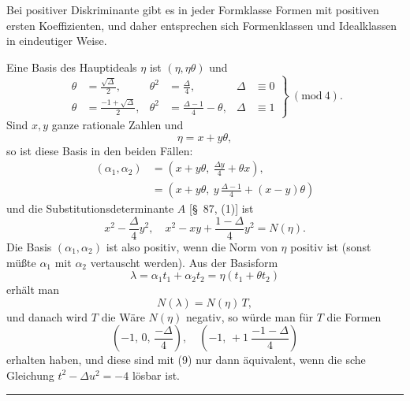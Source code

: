 

Bei positiver Diskriminante gibt es in jeder Formklasse Formen mit positiven ersten Koeffizienten, und daher entsprechen sich Formenklassen und Idealklassen in eindeutiger Weise.

Eine Basis des Hauptideals $\eta$ ist $(\eta, \eta\theta)$ und
\[
\left.\begin{aligned}
\theta &= \frac{\sqrt{\Delta}}{2}, & \theta^2 &= \frac{\Delta}{4}, & \Delta &\equiv 0\\
\theta &= \frac{-1+\sqrt{\Delta}}{2}, & \theta^2 &= \frac{\Delta-1}{4} - \theta, & \Delta &\equiv 1
\end{aligned}\right\}\ (\mathrm{mod}\ 4).
\]
Sind $x, y$ ganze rationale Zahlen und
\[
\eta = x + y\theta,
\]
so ist diese Basis in den beiden Fällen:
\[
\begin{aligned}
(\alpha_1, \alpha_2) &= \left(x + y\theta,\ \frac{\Delta y}{4} + \theta x\right),\\
&= \left(x + y\theta,\ y\,\frac{\Delta-1}{4} + (x-y)\theta\right)
\end{aligned}
\]
und die Substitutionsdeterminante $A$ [\S\ 87, (1)] ist
\[
x^2 - \frac{\Delta}{4}y^2, \quad x^2 - xy + \frac{1-\Delta}{4}y^2 = N(\eta).
\]
Die Basis $(\alpha_1, \alpha_2)$ ist also positiv, wenn die Norm von $\eta$ positiv ist (sonst müßte $\alpha_1$ mit $\alpha_2$ vertauscht werden). Aus der Basisform
\[
\lambda = \alpha_1 t_1 + \alpha_2 t_2 = \eta(t_1 + \theta t_2)
\]
erhält man
\[
N(\lambda) = N(\eta)\,T,
\]
und danach wird $T$ die 
Wäre $N(\eta)$ negativ, so würde man für $T$ die Formen
\[
\left(-1,\,0,\,\frac{-\Delta}{4}\right), \quad \left(-1,\,+1\ \frac{-1-\Delta}{4}\right) %
\]
erhalten haben, und diese sind mit (9) nur dann äquivalent, wenn die sche Gleichung $t^2 - \Delta u^2 = -4$ lösbar ist.

\rule{4cm}{0.4pt}
